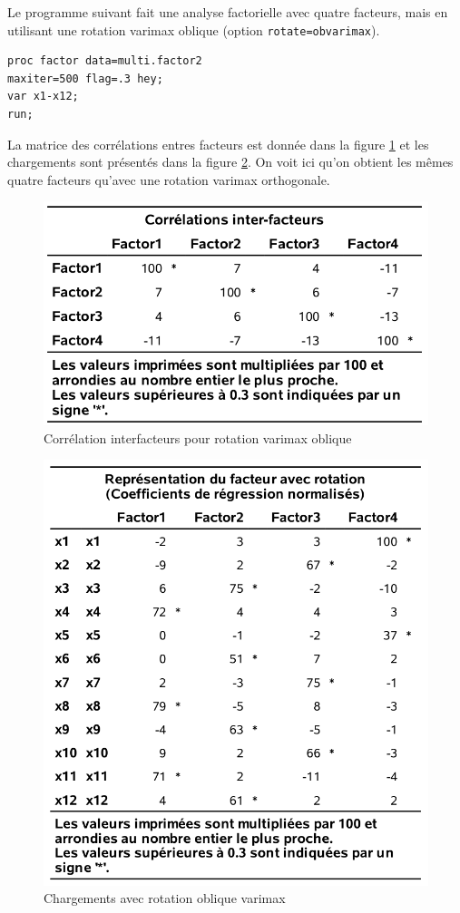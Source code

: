 \documentclass[
  11pt,
  letterpaper,
]{book}
\theoremstyle{definition}
\theoremstyle{definition}
\theoremstyle{definition}
\theoremstyle{remark}
\begin{document}
Le programme suivant fait une analyse factorielle avec quatre facteurs, mais en utilisant une rotation varimax oblique (option \texttt{rotate=obvarimax}).

\begin{verbatim}
proc factor data=multi.factor2
maxiter=500 flag=.3 hey;
var x1-x12;
run;
\end{verbatim}

La matrice des corrélations entres facteurs est donnée dans la figure \ref{fig:fig1p13} et les chargements sont présentés dans la figure \ref{fig:fig1p14}. On voit ici qu'on obtient les mêmes quatre facteurs qu'avec une rotation varimax orthogonale.

\begin{figure}

{\centering \includegraphics[width=0.7\linewidth]{figures/01-facto-e13} 

}

\caption{Corrélation interfacteurs pour rotation varimax oblique}\label{fig:fig1p13}
\end{figure}

\begin{figure}

{\centering \includegraphics[width=0.7\linewidth]{figures/01-facto-e14} 

}

\caption{Chargements avec rotation oblique varimax}\label{fig:fig1p14}
\end{figure}
\end{document}
